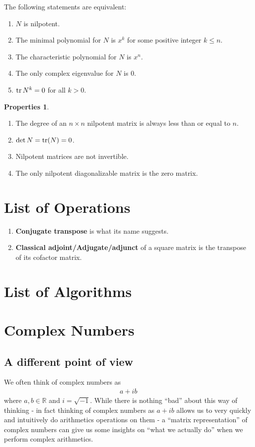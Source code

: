 \documentclass{article}
\theoremstyle{definition}
\newtheorem{prop}{Properties}[section]
\newcommand{\R}{\mathbb{R}}
\begin{document}
\begin{enumerate}
	The following statements are equivalent:
	\begin{enumerate} 
		\item $N$ is nilpotent.
		\item The minimal polynomial for $N$ is $x^k$ for some positive integer $k\leq n$.
		\item The characteristic polynomial for $N$ is $x^n$.
		\item The only complex eigenvalue for $N$ is 0.
		\item $\tr N^k = 0$ for all $k > 0$.
	\end{enumerate}
	\begin{prop}
		$\,$
		\begin{enumerate}
			\item The degree of an $n\times n$ nilpotent matrix is always less than or equal to $n$. 
			\item $\det N = \tr(N) = 0$.
			\item Nilpotent matrices are not invertible.
			\item The only nilpotent diagonalizable matrix is the zero matrix. 
		\end{enumerate}
	\end{prop}
\end{enumerate}

\newpage
\section{List of Operations}
\begin{enumerate}
	\item \textbf{Conjugate transpose} is what its name suggests.
	\item \textbf{Classical adjoint/Adjugate/adjunct} of a square matrix is the transpose of its cofactor matrix. 
\end{enumerate}
\newpage

\section{List of Algorithms}
\newpage

\section{Complex Numbers}
\subsection{A different point of view}
We often think of complex numbers as
\begin{align*}
a + ib
\end{align*}
where $a,b \in \R$ and $i = \sqrt{-1}$. While there is nothing ``bad'' about this way of thinking - in fact thinking of complex numbers as $a+ib$ allows us to very quickly and intuitively do arithmetics operations on them - a ``matrix representation'' of complex numbers can give us some insights on ``what we actually do'' when we perform complex arithmetics.\\
\end{document}
